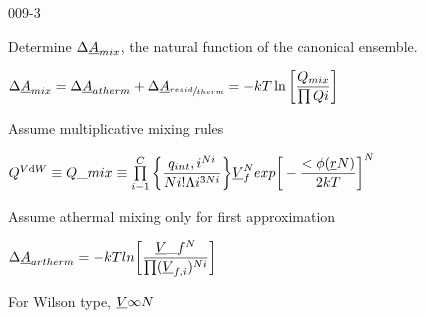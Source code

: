 \begin{mitframe}{009-3}

        
\begin{listone}        
    \item Determine $\iipf\uline{\helmholtz}_{\mixfunc}$, the natural function of the canonical ensemble.
    
    \begin{listtwo}
    	\item $\iipf\uline{\helmholtz}_{\mixfunc}=\iipf\uline{\helmholtz}_{atherm}+\iipf\uline{\helmholtz}_{\sfrac{resid}{therm}}=-\thermcond\Temp\ln\bigg[\dfrac{\heatflow_{\mixfunc}}{\prod\heatflow{\state}}\bigg]$     	%
    
    \end{listtwo}
    
    \item Assume multiplicative mixing rules
    
    \begin{listtwo}
    	
      \item $\heatflow^{\vol\mathrm{d}\work}\equiv\heatflow\_{\mixfunc}\equiv\prod\limits_{\state-1}^{\conc}\bigg\{\dfrac{\impc,\state^{\nummoles\state}}{\nummoles\state{!}\debroglie\state^{3\nummoles\state}}\bigg\}\uline{\vol}_{\fug}^{\nummoles}exp\bigg[-\dfrac{<\eleccoeff(\uline{\pos}\nummoles)}{2\thermcond\Temp}\bigg]^{\nummoles}$      
         
    \end{listtwo}
    
    \item Assume athermal mixing only for first approximation
    
    \begin{listtwo}
    	
        \item$\iipf\uline{\helmholtz}_{artherm}=-\thermcond\Temp{ln}\bigg[\dfrac{\uline{\vol}\_{\fug}^{\nummoles}}{\prod(\uline{\vol}_{\fug,\state})^{\nummoles\state}}\bigg]$
        
        \begin{listthree}
        
        	\item For Wilson type, $\uline{\vol}\infty\nummoles$
        

\end{listthree}
\end{listtwo}
\end{listone}
\end{mitframe}
